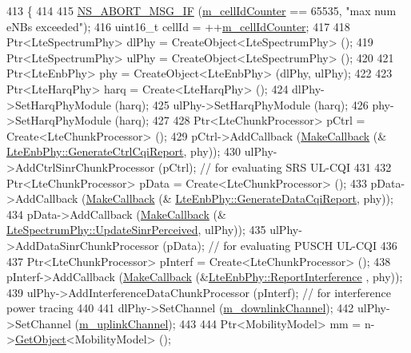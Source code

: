 \begin{DoxyCode}
413 \{
414 
415   \hyperlink{group__fatal_ga6653324225bc139e46deea177614ceee}{NS\_ABORT\_MSG\_IF} (\hyperlink{classns3_1_1LteHelper_a60f0f5feb3d9c6ac2e175f126c1ef4d4}{m\_cellIdCounter} == 65535, \textcolor{stringliteral}{"max num eNBs exceeded"});
416   uint16\_t cellId = ++\hyperlink{classns3_1_1LteHelper_a60f0f5feb3d9c6ac2e175f126c1ef4d4}{m\_cellIdCounter};
417 
418   Ptr<LteSpectrumPhy> dlPhy = CreateObject<LteSpectrumPhy> ();
419   Ptr<LteSpectrumPhy> ulPhy = CreateObject<LteSpectrumPhy> ();
420 
421   Ptr<LteEnbPhy> phy = CreateObject<LteEnbPhy> (dlPhy, ulPhy);
422 
423   Ptr<LteHarqPhy> harq = Create<LteHarqPhy> ();
424   dlPhy->SetHarqPhyModule (harq);
425   ulPhy->SetHarqPhyModule (harq);
426   phy->SetHarqPhyModule (harq);
427 
428   Ptr<LteChunkProcessor> pCtrl = Create<LteChunkProcessor> ();
429   pCtrl->AddCallback (\hyperlink{group__makecallbackmemptr_ga9376283685aa99d204048d6a4b7610a4}{MakeCallback} (&
      \hyperlink{classns3_1_1LteEnbPhy_abf6978d738fa1f07c4ca36dd1b6fd5b1}{LteEnbPhy::GenerateCtrlCqiReport}, phy));
430   ulPhy->AddCtrlSinrChunkProcessor (pCtrl); \textcolor{comment}{// for evaluating SRS UL-CQI}
431 
432   Ptr<LteChunkProcessor> pData = Create<LteChunkProcessor> ();
433   pData->AddCallback (\hyperlink{group__makecallbackmemptr_ga9376283685aa99d204048d6a4b7610a4}{MakeCallback} (&
      \hyperlink{classns3_1_1LteEnbPhy_a606a5f28fc9d71d470d305b967698596}{LteEnbPhy::GenerateDataCqiReport}, phy));
434   pData->AddCallback (\hyperlink{group__makecallbackmemptr_ga9376283685aa99d204048d6a4b7610a4}{MakeCallback} (&
      \hyperlink{classns3_1_1LteSpectrumPhy_a81e55daa6bf70765f7e7ff7cca0faed9}{LteSpectrumPhy::UpdateSinrPerceived}, ulPhy));
435   ulPhy->AddDataSinrChunkProcessor (pData); \textcolor{comment}{// for evaluating PUSCH UL-CQI}
436 
437   Ptr<LteChunkProcessor> pInterf = Create<LteChunkProcessor> ();
438   pInterf->AddCallback (\hyperlink{group__makecallbackmemptr_ga9376283685aa99d204048d6a4b7610a4}{MakeCallback} (&\hyperlink{classns3_1_1LteEnbPhy_a41cfff736fd62873a41e569c7dcc2287}{LteEnbPhy::ReportInterference}
      , phy));
439   ulPhy->AddInterferenceDataChunkProcessor (pInterf); \textcolor{comment}{// for interference power tracing}
440 
441   dlPhy->SetChannel (\hyperlink{classns3_1_1LteHelper_a5c2237946550d801d80c0d0bee0b4cfb}{m\_downlinkChannel});
442   ulPhy->SetChannel (\hyperlink{classns3_1_1LteHelper_ad61b21e2f55749e680942016b2e57abe}{m\_uplinkChannel});
443 
444   Ptr<MobilityModel> mm = n->\hyperlink{classns3_1_1Object_a13e18c00017096c8381eb651d5bd0783}{GetObject}<MobilityModel> ();

\end{DoxyCode}
